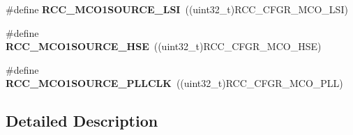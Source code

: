 \begin{DoxyCompactItemize}
\item 
\hypertarget{group___r_c_c___m_c_o1___clock___source_ga4ada18d28374df66c1b6da16606c23d8}{\#define {\bfseries R\-C\-C\-\_\-\-M\-C\-O1\-S\-O\-U\-R\-C\-E\-\_\-\-L\-S\-I}~((uint32\-\_\-t)R\-C\-C\-\_\-\-C\-F\-G\-R\-\_\-\-M\-C\-O\-\_\-\-L\-S\-I)}\label{group___r_c_c___m_c_o1___clock___source_ga4ada18d28374df66c1b6da16606c23d8}

\item 
\hypertarget{group___r_c_c___m_c_o1___clock___source_ga5582d2ab152eb440a6cc3ae4833b043f}{\#define {\bfseries R\-C\-C\-\_\-\-M\-C\-O1\-S\-O\-U\-R\-C\-E\-\_\-\-H\-S\-E}~((uint32\-\_\-t)R\-C\-C\-\_\-\-C\-F\-G\-R\-\_\-\-M\-C\-O\-\_\-\-H\-S\-E)}\label{group___r_c_c___m_c_o1___clock___source_ga5582d2ab152eb440a6cc3ae4833b043f}

\item 
\hypertarget{group___r_c_c___m_c_o1___clock___source_ga79d888f2238eaa4e4b8d02b3900ea18b}{\#define {\bfseries R\-C\-C\-\_\-\-M\-C\-O1\-S\-O\-U\-R\-C\-E\-\_\-\-P\-L\-L\-C\-L\-K}~((uint32\-\_\-t)R\-C\-C\-\_\-\-C\-F\-G\-R\-\_\-\-M\-C\-O\-\_\-\-P\-L\-L)}\label{group___r_c_c___m_c_o1___clock___source_ga79d888f2238eaa4e4b8d02b3900ea18b}

\end{DoxyCompactItemize}


\subsection{Detailed Description}

